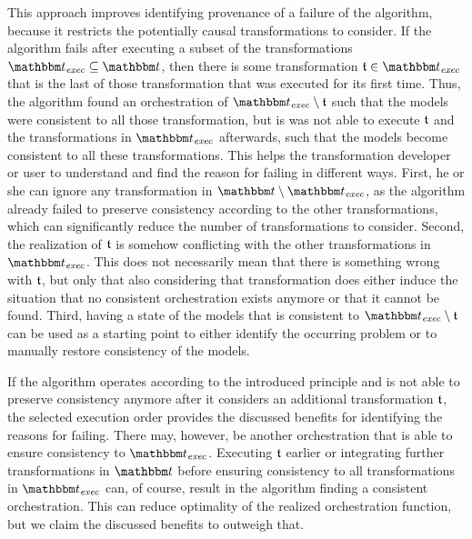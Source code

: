 This approach improves identifying provenance of a failure of the algorithm, because it restricts the potentially causal transformations to consider.
If the algorithm fails after executing a subset of the transformations $\transformationset{T}_\mathvariable{exec} \subseteq \transformationset{T}$,
then there is some transformation $\transformation{t} \in \transformationset{T}_\mathvariable{exec}$ that is the last of those transformation that was executed for its first time.
Thus, the algorithm found an orchestration of $\transformationset{T}_\mathvariable{exec} \setminus \transformation{t}$ such that the models were consistent to all those transformation, but is was not able to execute $\transformation{t}$ and the transformations in $\transformationset{T}_\mathvariable{exec}$ afterwards, such that the models become consistent to all these transformations.
This helps the transformation developer or user to understand and find the reason for failing in different ways.
First, he or she can ignore any transformation in $\transformationset{T} \setminus \transformationset{T}_\mathvariable{exec}$, as the algorithm already failed to preserve consistency according to the other transformations, which can significantly reduce the number of transformations to consider.
Second, the realization of $\transformation{t}$ is somehow conflicting with the other transformations in $\transformationset{T}_\mathvariable{exec}$. This does not necessarily mean that there is something wrong with $\transformation{t}$, but only that also considering that transformation does either induce the situation that no consistent orchestration exists anymore or that it cannot be found.
Third, having a state of the models that is consistent to $\transformationset{T}_\mathvariable{exec} \setminus \transformation{t}$ can be used as a starting point to either identify the occurring problem or to manually restore consistency of the models.

If the algorithm operates according to the introduced principle and is not able to preserve consistency anymore after it considers an additional transformation $\transformation{t}$, the selected execution order provides the discussed benefits for identifying the reasons for failing.
There may, however, be another orchestration that is able to ensure consistency to $\transformationset{T}_\mathvariable{exec}$. Executing $\transformation{t}$ earlier or integrating further transformations in $\transformationset{T}$ before ensuring consistency to all transformations in $\transformationset{T}_\mathvariable{exec}$ can, of course, result in the algorithm finding a consistent orchestration.
This can reduce optimality of the realized orchestration function, but we claim the discussed benefits to outweigh that.


